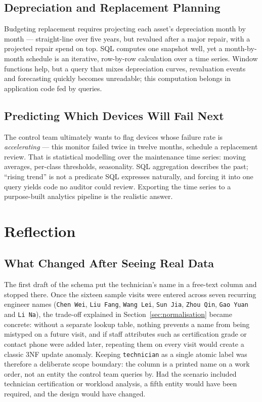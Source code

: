 \documentclass[conference]{IEEEtran}
\begin{document}
\subsection{Depreciation and Replacement Planning}
Budgeting replacement requires projecting each asset's depreciation month by
month --- straight-line over five years, but revalued after a major repair,
with a projected repair spend on top. SQL computes one snapshot well, yet a
month-by-month schedule is an iterative, row-by-row calculation over a time
series. Window functions help, but a query that mixes depreciation curves,
revaluation events and forecasting quickly becomes unreadable; this
computation belongs in application code fed by queries.

\subsection{Predicting Which Devices Will Fail Next}
The control team ultimately wants to flag devices whose failure rate is
\emph{accelerating} --- this monitor failed twice in twelve months, schedule
a replacement review. That is statistical modelling over the maintenance
time series: moving averages, per-class thresholds, seasonality. SQL
aggregation describes the past; ``rising trend'' is not a predicate SQL
expresses naturally, and forcing it into one query yields code no auditor
could review. Exporting the time series to a purpose-built analytics
pipeline is the realistic answer.

\section{Reflection}\label{sec:reflection}
\subsection{What Changed After Seeing Real Data}
The first draft of the schema put the technician's name in a free-text
column and stopped there. Once the sixteen sample visits were entered across
seven recurring engineer names (\texttt{Chen Wei}, \texttt{Liu Fang},
\texttt{Wang Lei}, \texttt{Sun Jia}, \texttt{Zhou Qin}, \texttt{Gao Yuan} and
\texttt{Li Na}), the trade-off explained in Section~\ref{sec:normalisation}
became concrete: without a separate lookup table, nothing prevents a name from
being mistyped on a future visit, and if staff attributes such as
certification grade or contact phone were added later, repeating them on every
visit would create a classic 3NF update anomaly. Keeping \texttt{technician}
as a single atomic label was therefore a deliberate scope boundary: the column
is a printed name on a work order, not an entity the control team queries by.
Had the scenario included technician certification or workload analysis, a
fifth entity would have been required, and the design would have changed.
\end{document}
